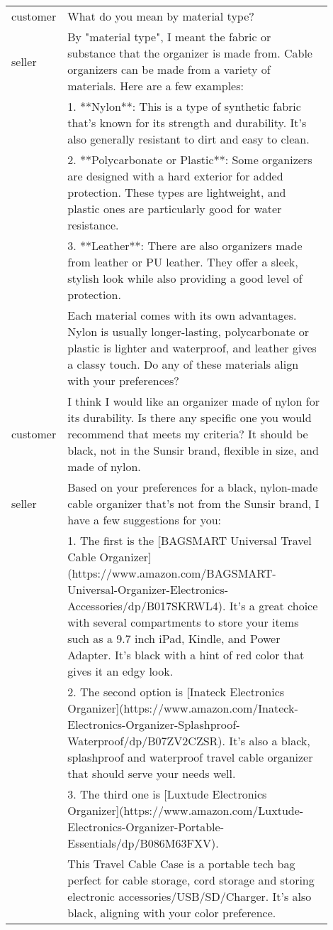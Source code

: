 \begin{table*}[t]
\begin{center}
\begin{tabular}{l p{0.9\linewidth} }
    customer& What do you mean by material type?\\\hdashline
    seller& By "material type", I meant the fabric or substance that the organizer is made from. Cable organizers can be made from a variety of materials. Here are a few examples:\\
    &1. **Nylon**: This is a type of synthetic fabric that's known for its strength and durability. It's also generally resistant to dirt and easy to clean.\\
    &2. **Polycarbonate or Plastic**: Some organizers are designed with a hard exterior for added protection. These types are lightweight, and plastic ones are particularly good for water resistance.\\
    &3. **Leather**: There are also organizers made from leather or PU leather. They offer a sleek, stylish look while also providing a good level of protection.\\
    &Each material comes with its own advantages. Nylon is usually longer-lasting, polycarbonate or plastic is lighter and waterproof, and leather gives a classy touch. Do any of these materials align with your preferences?\\\hdashline
    customer& I think I would like an organizer made of nylon for its durability. Is there any specific one you would recommend that meets my criteria? It should be black, not in the Sunsir brand, flexible in size, and made of nylon.\\\hdashline
    seller& Based on your preferences for a black, nylon-made cable organizer that's not from the Sunsir brand, I have a few suggestions for you:\\
    &1. The first is the [BAGSMART Universal Travel Cable Organizer](https://www.amazon.com/BAGSMART-Universal-Organizer-Electronics-Accessories/dp/B017SKRWL4). It's a great choice with several compartments to store your items such as a 9.7 inch iPad, Kindle, and Power Adapter. It's black with a hint of red color that gives it an edgy look.\\
    &2. The second option is [Inateck Electronics Organizer](https://www.amazon.com/Inateck-Electronics-Organizer-Splashproof-Waterproof/dp/B07ZV2CZSR). It's also a black, splashproof and waterproof travel cable organizer that should serve your needs well.\\
    &3. The third one is [Luxtude Electronics Organizer](https://www.amazon.com/Luxtude-Electronics-Organizer-Portable-Essentials/dp/B086M63FXV). \\
    &This Travel Cable Case is a portable tech bag perfect for cable storage, cord storage and storing electronic accessories/USB/SD/Charger. It's also black, aligning with your color preference.\\

\end{tabular}
\end{center}
\end{table*}
